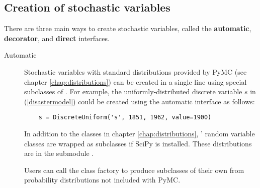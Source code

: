 \subsection{Creation of stochastic variables}
There are three main ways to create stochastic variables, called the \textbf{automatic}, \textbf{decorator}, and \textbf{direct} interfaces.

\begin{description}
    \item[Automatic] Stochastic variables with standard distributions provided by PyMC (see chapter \ref{chap:distributions}) can be created in a single line using special subclasses of . For example, the uniformly-distributed discrete variable $s$ in (\ref{disastermodel}) could be created using the automatic interface as follows:
\begin{verbatim}
    s = DiscreteUniform('s', 1851, 1962, value=1900)
\end{verbatim}

    In addition to the classes in chapter \ref{chap:distributions}, ' random variable classes are wrapped as  subclasses if SciPy is installed. These distributions are in the submodule .

    Users can call the class factory  to produce  subclasses of their own from probability distributions not included with PyMC.%



\end{description}
